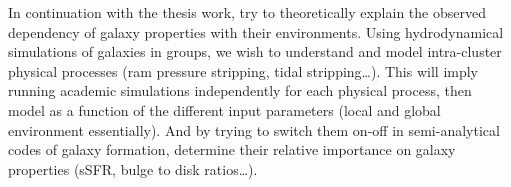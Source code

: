 In continuation with the thesis work, try to theoretically explain the observed
dependency of galaxy properties with their environments. Using hydrodynamical
simulations of galaxies in groups, we wish to understand and model
intra-cluster physical processes (ram pressure stripping, tidal
stripping\ldots). This will imply running academic simulations independently
for each physical process, then model as a function of the different input
parameters (local and global environment essentially). And by trying to switch
them on-off in semi-analytical codes of galaxy formation, determine their
relative importance on galaxy properties (sSFR, bulge to disk ratios\ldots).

